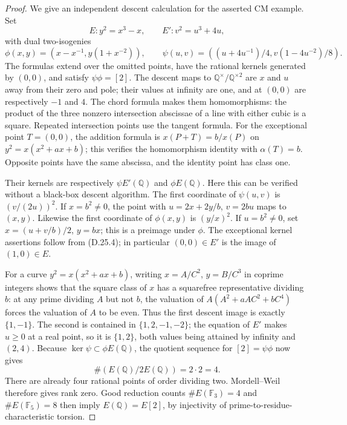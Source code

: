 \begin{proof}
We give an independent descent calculation
for the asserted CM example. Set
\[
 E:y^2=x^3-x,\qquad E':v^2=u^3+4u,
\]
with dual two-isogenies
\[
 \phi(x,y)=(x-x^{-1},y(1+x^{-2})),\qquad
 \psi(u,v)=((u+4u^{-1})/4,v(1-4u^{-2})/8).
                                                               \tag{D.25.4}
\]
The formulas extend over the omitted
points, have the rational kernels generated
by \((0,0)\), and satisfy \(\psi\phi=[2]\).
The descent maps to \(\mathbb Q^\times/
\mathbb Q^{\times2}\) are \(x\) and \(u\)
away from their zero and pole; their
values at infinity are one, and at
\((0,0)\) are respectively \(-1\) and
\(4\). The chord formula makes them
homomorphisms: the product of the three
nonzero intersection abscissae of a line
with either cubic is a square. Repeated
intersection points use the tangent formula.
For the exceptional point \(T=(0,0)\),
the addition formula is
\(x(P+T)=b/x(P)\) on
\(y^2=x(x^2+ax+b)\); this verifies the
homomorphism identity with \(\alpha(T)=b\).
Opposite points have the same abscissa,
and the identity point has class one.

Their kernels are respectively
\(\psi E'(\mathbb Q)\) and
\(\phi E(\mathbb Q)\). Here this can be
verified without a black-box descent
algorithm. The first coordinate of
\(\psi(u,v)\) is \((v/(2u))^2\).
If \(x=b^2\ne0\), the point with
\(u=2x+2y/b\), \(v=2bu\) maps to
\((x,y)\). Likewise the first coordinate
of \(\phi(x,y)\) is \((y/x)^2\).
If \(u=b^2\ne0\), set
\(x=(u+v/b)/2\), \(y=bx\); this is a
preimage under \(\phi\). The exceptional
kernel assertions follow from (D.25.4);
in particular \((0,0)\in E'\) is the
image of \((1,0)\in E\).

For a curve \(y^2=x(x^2+ax+b)\), writing
\(x=A/C^2\), \(y=B/C^3\) in coprime
integers shows that the square class of
\(x\) has a squarefree representative
dividing \(b\): at any prime dividing
\(A\) but not \(b\), the valuation of
\(A(A^2+aAC^2+bC^4)\) forces the
valuation of \(A\) to be even. Thus the
first descent image is exactly
\(\{1,-1\}\). The second is contained
in \(\{1,2,-1,-2\}\); the equation of
\(E'\) makes \(u\ge0\) at a real point,
so it is \(\{1,2\}\), both values being
attained by infinity and \((2,4)\).
Because \(\ker\psi\subset\phi E(\mathbb Q)\),
the quotient sequence for \([2]=\psi\phi\)
now gives
\[
       \#(E(\mathbb Q)/2E(\mathbb Q))=2\cdot2=4.
\]
There are already four rational points
of order dividing two. Mordell--Weil
therefore gives rank zero. Good reduction
counts \(\#E(\mathbb F_3)=4\) and
\(\#E(\mathbb F_5)=8\) then imply
\(E(\mathbb Q)=E[2]\), by injectivity
of prime-to-residue-characteristic torsion.


\end{proof}
